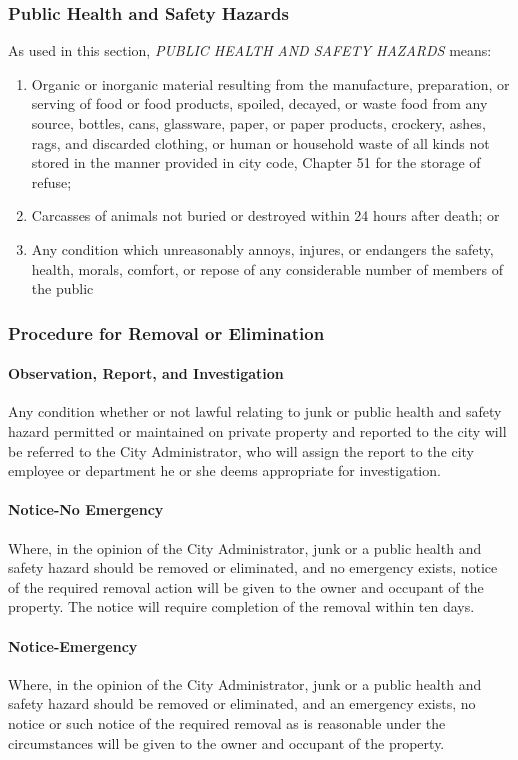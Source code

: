 \subsubsection{Public Health and Safety Hazards}
As used in this section, \emph{PUBLIC HEALTH AND SAFETY HAZARDS} means:
\begin{enumerate}[{\indent}a)]
    \item Organic or inorganic material resulting from the manufacture, preparation, or serving of food or food products, spoiled, decayed, or waste food from any source, bottles, cans, glassware, paper, or paper products, crockery, ashes, rags, and discarded clothing, or human or household waste of all kinds not stored in the manner provided in city code, Chapter 51 for the storage of refuse; 
    \item Carcasses of animals not buried or destroyed within 24 hours after death; or 
    \item Any condition which unreasonably annoys, injures, or endangers the safety, health, morals, comfort, or repose of any considerable number of members of the public 
\end{enumerate}
\subsubsection{Procedure for Removal or Elimination}
\paragraph{Observation, Report, and Investigation}
Any condition whether or not lawful relating to junk or public health and safety hazard permitted or maintained on private property and reported to the city will be referred to the City Administrator, who will assign the report to the city employee or department he or she deems appropriate for investigation.
\paragraph{Notice-No Emergency}
Where, in the opinion of the City Administrator, junk or a public health and safety hazard should be removed or eliminated, and no emergency exists, notice of the required removal action will be given to the owner and occupant of the property.  The notice will require completion of the removal within ten days.
\paragraph{Notice-Emergency}
Where, in the opinion of the City Administrator, junk or a public health and safety hazard should be removed or eliminated, and an emergency exists, no notice or such notice of the required removal as is reasonable under the circumstances will be given to the owner and occupant of the property.
